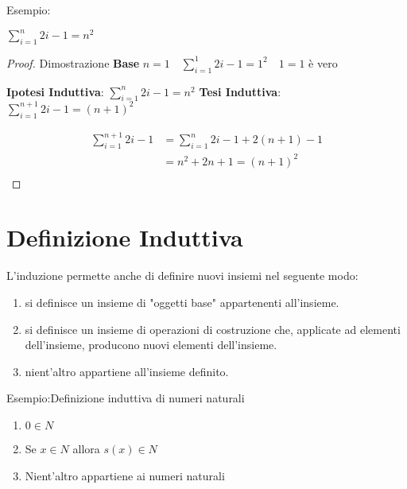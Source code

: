 Esempio:\newline
\begin{thm}
 $\displaystyle \sum_{i = 1}^n 2i-1 = n^2$
\end{thm}

\begin{proof}
Dimostrazione\newline
\textbf{Base} $n = 1 \quad \displaystyle \sum_{i = 1}^1 2i-1 = 1^2 \quad 1 = 1$ è vero

\textbf{Ipotesi Induttiva}: $\displaystyle \sum_{i = 1}^n 2i-1 = n^2$ \newline
\textbf{Tesi Induttiva}: $\displaystyle \sum_{i = 1}^{n+1} 2i-1 = (n+1)^2$

\begin{equation*}
\begin{split}
  \sum_{i=1}^{n+1} 2i-1 & = \sum_{i=1}^n 2i-1 + 2(n+1) - 1 \\
         & = n^2 + 2n + 1 = (n+1)^2 \\
\end{split}
\end{equation*}
\end{proof}

\section{Definizione Induttiva}
L'induzione permette anche di definire nuovi insiemi nel seguente modo:

\begin{enumerate}
  \item si definisce un insieme di "oggetti base" appartenenti all'insieme.
  \item si definisce un insieme di operazioni di costruzione che, applicate ad elementi
        dell'insieme, producono nuovi elementi dell'insieme.
  \item nient'altro appartiene all'insieme definito.
\end{enumerate}

Esempio:Definizione induttiva di numeri naturali\newline
\begin{enumerate}
  \item $0 \in N$
  \item Se $x \in N$ allora $s(x) \in N$
  \item Nient'altro appartiene ai numeri naturali
\end{enumerate}


